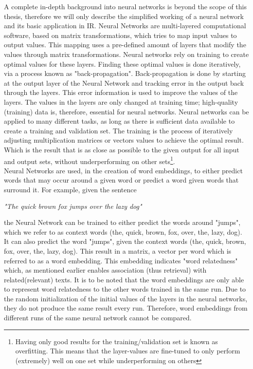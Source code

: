 \documentclass[../../Thesis.tex]{subfiles}
\begin{document}
A complete in-depth background into neural networks is beyond the scope of this thesis, therefore we will only describe the simplified working of a neural network and its basic application in IR.
Neural Networks are multi-layered computational software, based on matrix transformations, which tries to map input values to output values. This mapping uses a pre-defined amount of layers that modify the values through matrix transformations. Neural networks rely on training to create optimal values for these layers. Finding these optimal values is done iteratively, via a process known as "back-propagation". Back-propagation is done by starting at the output layer of the Neural Network and tracking error in the output back through the layers. This error information is used to improve the values of the layers. The values in the layers are only changed at training time; high-quality (training) data is, therefore, essential for neural networks. Neural networks can be applied to many different tasks, as long as there is sufficient data available to create a training and validation set. The training is the process of iteratively adjusting multiplication matrices or vectors values to achieve the optimal result. Which is the result that is as close as possible to the given output for all input and output sets, without underperforming on other sets\footnote{Having only good results for the training/validation set is known as overfitting. This means that the layer-values are fine-tuned to only perform (extremely) well on one set while underperforming on others}.\\Neural Networks are used, in the creation of word embeddings, to either predict words that may occur around a given word or predict a word given words that surround it. For example, given the sentence\\
\begin{center}
\textit{"The quick brown fox jumps over the lazy dog"}
\end{center}
the Neural Network can be trained to either predict the words around "jumps", which we refer to as context words (the, quick, brown, fox, over, the, lazy, dog). It can also predict the word "jumps", given the context words (the, quick, brown, fox, over, the, lazy, dog). This result in a matrix, a vector per word which is referred to as a word embedding. This embedding indicates "word relatedness" which, as mentioned earlier enables association (thus retrieval) with related(relevant) texts. It is to be noted that the word embeddings are only able to represent word relatedness to the other words trained in the same run. Due to the random initialization of the initial values of the layers in the neural networks, they do not produce the same result every run. Therefore, word embeddings from different runs of the same neural network cannot be compared.
\end{document}
